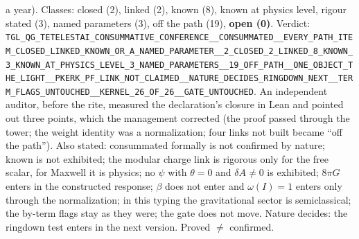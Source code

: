 \documentclass[11pt]{article}
\theoremstyle{definition}\newtheorem{deriv}{Derivation}
\begin{document}
a year). Classes: closed (2), linked (2), known (8), known at physics level, rigour stated (3), named parameters (3), off the path (19), \textbf{open (0)}. Verdict: \texttt{TGL\_QG\_TETELESTAI\_CONSUMMATIVE\_CONFERENCE\_\_CONSUMMATED\_\_EVERY\_PATH\_ITEM\_CLOSED\_LINKED\_KNOWN\_OR\_A\_NAMED\_PARAMETER\_\_2\_CLOSED\_2\_LINKED\_8\_KNOWN\_3\_KNOWN\_AT\_PHYSICS\_LEVEL\_3\_NAMED\_PARAMETERS\_\_19\_OFF\_PATH\_\_ONE\_OBJECT\_THE\_LIGHT\_\_PKERK\_PF\_LINK\_NOT\_CLAIMED\_\_NATURE\_DECIDES\_RINGDOWN\_NEXT\_\_TERM\_FLAGS\_UNTOUCHED\_\_KERNEL\_26\_OF\_26\_\_GATE\_UNTOUCHED}. An independent auditor, before the rite, measured the declaration's closure in Lean and pointed out three points, which the management corrected (the proof passed through the tower; the weight identity was a normalization; four links not built became ``off the path''). Also stated: consummated formally is not confirmed by nature; known is not exhibited; the modular charge link is rigorous only for the free scalar, for Maxwell it is physics; no $\psi$ with $\theta=0$ and $\delta A\neq0$ is exhibited; $8\pi G$ enters in the constructed response; $\beta$ does not enter and $\omega(I)=1$ enters only through the normalization; in this typing the gravitational sector is semiclassical; the by-term flags stay as they were; the gate does not move. Nature decides: the ringdown test enters in the next version. Proved $\neq$ confirmed.
\end{document}
